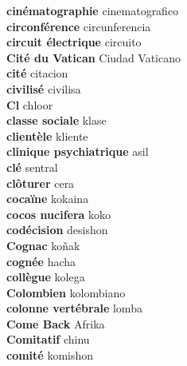\textbf{ cinématographie  } cinematografico \\
\textbf{ circonférence  } circunferencia \\
\textbf{ circuit électrique  } circuito \\
\textbf{ Cité du Vatican  } Ciudad Vaticano \\
\textbf{ cité  } citacion \\
\textbf{ civilisé  } civilisa \\
\textbf{ Cl  } chloor \\
\textbf{ classe sociale  } klase \\
\textbf{ clientèle  } kliente \\
\textbf{ clinique psychiatrique  } asil \\
\textbf{ clé  } sentral \\
\textbf{ clôturer  } cera \\
\textbf{ cocaïne  } kokaina \\
\textbf{ cocos nucifera  } koko \\
\textbf{ codécision  } desishon \\
\textbf{ Cognac  } koñak \\
\textbf{ cognée  } hacha \\
\textbf{ collègue  } kolega \\
\textbf{ Colombien  } kolombiano \\
\textbf{ colonne vertébrale  } lomba \\
\textbf{ Come Back  } Afrika \\
\textbf{ Comitatif  } chinu \\
\textbf{ comité  } komishon \\
